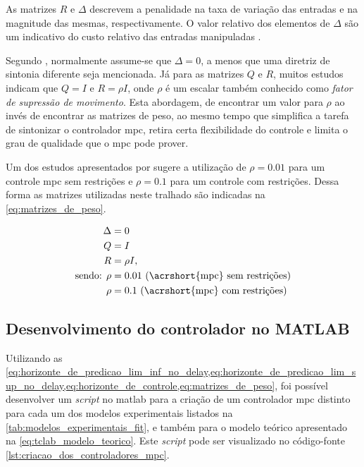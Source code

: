 As matrizes $R$ e $\Delta$ descrevem a penalidade na taxa de variação das entradas e na magnitude das mesmas, 
respectivamente. O valor relativo dos elementos de $\Delta$ são um indicativo do custo relativo das 
entradas manipuladas \cite{Alhajeri2020}.

Segundo , normalmente assume-se que $\Delta = 0$, a menos que uma diretriz de 
sintonia diferente seja mencionada. Já para as matrizes $Q$ e $R$, muitos estudos indicam que
$Q = I$ e $R = \rho I$, onde $\rho$ é um escalar também conhecido como \textit{fator de supressão de movimento}.
Esta abordagem, de encontrar um valor para $\rho$ ao invés de encontrar as matrizes de peso, ao mesmo tempo que
simplifica a tarefa de sintonizar o controlador \acrshort{mpc}, retira certa flexibilidade do controle e
limita o grau de qualidade que o \acrshort{mpc} pode prover.

Um dos estudos apresentados por  sugere a utilização de $\rho = 0.01$ para um controle
\acrshort{mpc} sem restrições e $\rho = 0.1$ para um controle com restrições. Dessa forma as matrizes utilizadas
neste tralhado são indicadas na \cref{eq:matrizes_de_peso}.

\begin{equation}
	\label{eq:matrizes_de_peso}
	\begin{aligned}
		\Delta &= 0																\\
		Q &= I																	\\
		R &= \rho I,															\\
		\text{sendo: } \rho &= 0.01 \text{ (\acrshort{mpc} sem restrições)}		\\
		\rho &= 0.1 \text{ (\acrshort{mpc} com restrições)}
	\end{aligned}
\end{equation}

\subsection{Desenvolvimento do controlador no MATLAB}
\label{subsec:desenvolvimento_do_controlador_no_matlab}

Utilizando as
\cref{eq:horizonte_de_predicao_lim_inf_no_delay,eq:horizonte_de_predicao_lim_sup_no_delay,eq:horizonte_de_controle,eq:matrizes_de_peso},
foi possível desenvolver um \textit{script} no \acrshort{matlab} para a criação de um controlador \acrshort{mpc}
distinto para cada um dos modelos experimentais listados na \cref{tab:modelos_experimentais_fit}, e também
para o modelo teórico apresentado na \cref{eq:tclab_modelo_teorico}. Este \textit{script} pode ser visualizado
no código-fonte \ref{lst:criacao_dos_controladores_mpc}.


